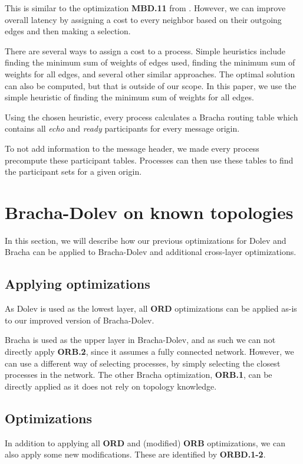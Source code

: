 This is similar to the optimization \textbf{MBD.11} from \cite{bonomi2021practical}. However, we can improve overall latency by assigning a cost to every neighbor based on their outgoing edges and then making a selection. 

There are several ways to assign a cost to a process. Simple heuristics include finding the minimum sum of weights of edges used, finding the minimum sum of weights for all edges, and several other similar approaches. The optimal solution can also be computed, but that is outside of our scope. In this paper, we use the simple heuristic of finding the minimum sum of weights for all edges.

Using the chosen heuristic, every process calculates a Bracha routing table which contains all \textit{echo} and \textit{ready} participants for every message origin.

To not add information to the message header, we made every process precompute these participant tables. Processes can then use these tables to find the participant sets for a given origin.


\section{Bracha-Dolev on known topologies}
\label{contr-bracha-dolev}
In this section, we will describe how our previous optimizations for Dolev and Bracha can be applied to Bracha-Dolev and additional cross-layer optimizations.

\subsection{Applying optimizations}
As Dolev is used as the lowest layer, all \textbf{ORD} optimizations can be applied as-is to our improved version of Bracha-Dolev.

Bracha is used as the upper layer in Bracha-Dolev, and as such we can not directly apply \textbf{ORB.2}, since it assumes a fully connected network. However, we can use a different way of selecting processes, by simply selecting the closest processes in the network.
The other Bracha optimization, \textbf{ORB.1}, can be directly applied as it does not rely on topology knowledge.

\subsection{Optimizations}
In addition to applying all \textbf{ORD} and (modified) \textbf{ORB} optimizations, we can also apply some new modifications. These are identified by \textbf{ORBD.1-2}.

